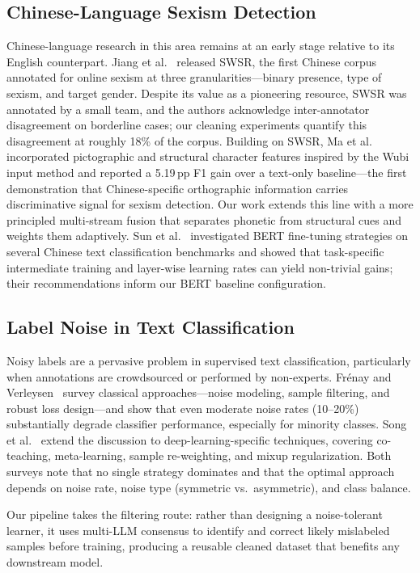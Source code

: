 ﻿\documentclass[12pt]{article}
\begin{document}
\subsection{Chinese-Language Sexism Detection}
Chinese-language research in this area remains at an early stage relative to its English counterpart. Jiang et al.~\cite{jiang2022swsr} released SWSR, the first Chinese corpus annotated for online sexism at three granularities---binary presence, type of sexism, and target gender. Despite its value as a pioneering resource, SWSR was annotated by a small team, and the authors acknowledge inter-annotator disagreement on borderline cases; our cleaning experiments quantify this disagreement at roughly 18\% of the corpus. Building on SWSR, Ma et al.~\cite{ma2024gender} incorporated pictographic and structural character features inspired by the Wubi input method and reported a 5.19\,pp F1 gain over a text-only baseline---the first demonstration that Chinese-specific orthographic information carries discriminative signal for sexism detection. Our work extends this line with a more principled multi-stream fusion that separates phonetic from structural cues and weights them adaptively. Sun et al.~\cite{sun2019finetune} investigated BERT fine-tuning strategies on several Chinese text classification benchmarks and showed that task-specific intermediate training and layer-wise learning rates can yield non-trivial gains; their recommendations inform our BERT baseline configuration.

\subsection{Label Noise in Text Classification}
Noisy labels are a pervasive problem in supervised text classification, particularly when annotations are crowdsourced or performed by non-experts. Fr\'{e}nay and Verleysen~\cite{frenay2014label} survey classical approaches---noise modeling, sample filtering, and robust loss design---and show that even moderate noise rates (10--20\%) substantially degrade classifier performance, especially for minority classes. Song et al.~\cite{song2023noisy} extend the discussion to deep-learning-specific techniques, covering co-teaching, meta-learning, sample re-weighting, and mixup regularization. Both surveys note that no single strategy dominates and that the optimal approach depends on noise rate, noise type (symmetric vs.\ asymmetric), and class balance.

Our pipeline takes the filtering route: rather than designing a noise-tolerant learner, it uses multi-LLM consensus to identify and correct likely mislabeled samples before training, producing a reusable cleaned dataset that benefits any downstream model.
\end{document}
